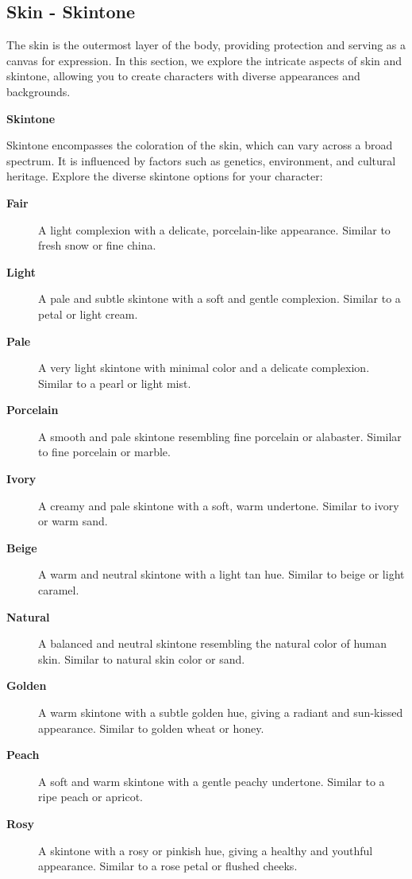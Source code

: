 \subsection{\textbf{Skin  - Skintone}}

The skin is the outermost layer of the body, providing protection and serving as a canvas for expression. In this section, we explore the intricate aspects of skin and skintone, allowing you to create characters with diverse appearances and backgrounds.

\textbf{Skintone}

Skintone encompasses the coloration of the skin, which can vary across a broad spectrum. It is influenced by factors such as genetics, environment, and cultural heritage. Explore the diverse skintone options for your character:

\begin{description}
    \item[\textbf{Fair}] A light complexion with a delicate, porcelain-like appearance. Similar to fresh snow or fine china.
    \item[\textbf{Light}] A pale and subtle skintone with a soft and gentle complexion. Similar to a petal or light cream.
    \item[\textbf{Pale}] A very light skintone with minimal color and a delicate complexion. Similar to a pearl or light mist.
    \item[\textbf{Porcelain}] A smooth and pale skintone resembling fine porcelain or alabaster. Similar to fine porcelain or marble.
    \item[\textbf{Ivory}] A creamy and pale skintone with a soft, warm undertone. Similar to ivory or warm sand.
    \item[\textbf{Beige}] A warm and neutral skintone with a light tan hue. Similar to beige or light caramel.
    \item[\textbf{Natural}] A balanced and neutral skintone resembling the natural color of human skin. Similar to natural skin color or sand.
    \item[\textbf{Golden}] A warm skintone with a subtle golden hue, giving a radiant and sun-kissed appearance. Similar to golden wheat or honey.
    \item[\textbf{Peach}] A soft and warm skintone with a gentle peachy undertone. Similar to a ripe peach or apricot.
    \item[\textbf{Rosy}] A skintone with a rosy or pinkish hue, giving a healthy and youthful appearance. Similar to a rose petal or flushed cheeks.

\end{description}
